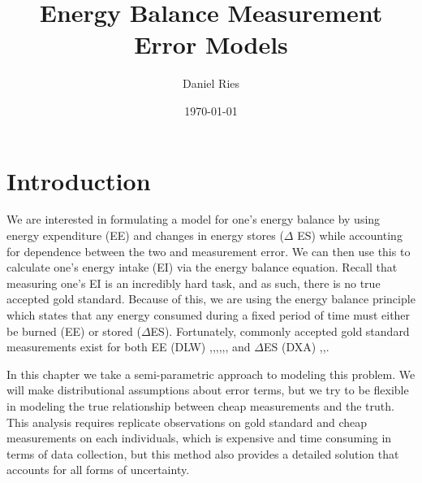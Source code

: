\documentclass[11pt]{article}\usepackage[]{graphicx}\usepackage[]{color}
\begin{document}
\title{Energy Balance Measurement Error Models}
\author{Daniel Ries}
\date{\today}
\maketitle

\section{Introduction}

We are interested in formulating a model for one's energy balance by using energy expenditure (EE) and changes in energy stores ($\Delta$ ES) while accounting for dependence between the two and measurement error. We can then use this to calculate one's energy intake (EI) via the energy balance equation.   Recall that measuring one's EI is an incredibly hard task, and as such, there is no true accepted gold standard. Because of this, we are using the energy balance principle which states that any energy consumed during a fixed period of time must either be burned (EE) or stored ($\Delta$ES). Fortunately, commonly accepted gold standard measurements exist for both EE (DLW) \cite{lagerros},\cite{bouten},\cite{thomas11},\cite{hall11},\cite{gilmore},\cite{sanghvi15}, \cite{racette11} and $\Delta$ES (DXA) \cite{thomas11},\cite{sanghvi15},\cite{gilmore}. 

In this chapter we take a semi-parametric approach to modeling this problem. We will make distributional assumptions about error terms, but we try to be flexible in modeling the true relationship between cheap measurements and the truth. This analysis requires replicate observations on gold standard and cheap measurements on each individuals, which is expensive and time consuming in terms of data collection, but this method also provides a detailed solution that accounts for all forms of uncertainty.


\end{document}
